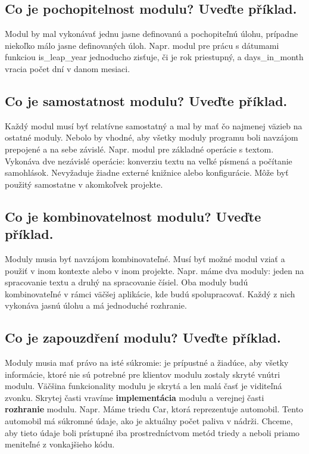 \subsection{Co je pochopitelnost modulu? Uveďte příklad.}
Modul by mal vykonávať jednu jasne definovanú a pochopiteľnú úlohu, prípadne niekoľko málo jasne definovaných úloh. \newline
Napr. modul pre prácu s dátumami funkciou is\_leap\_year jednoducho zisťuje, či je rok priestupný, a days\_in\_month vracia počet dní v danom mesiaci.


\subsection{Co je samostatnost modulu? Uveďte příklad.}
Každý modul musí byť relatívne samostatný a mal by mať čo najmenej väzieb na ostatné moduly. Nebolo by vhodné, aby všetky moduly programu boli navzájom prepojené a na sebe závislé. \newline
Napr. modul pre základné operácie s textom. Vykonáva dve nezávislé operácie: konverziu textu na veľké písmená a počítanie samohlások. Nevyžaduje žiadne externé knižnice alebo konfigurácie. Môže byť použitý samostatne v akomkoľvek projekte.


\subsection{Co je kombinovatelnost modulu? Uveďte příklad.}
Moduly musia byť navzájom kombinovateľné. Musí byť možné modul vziať a použiť v inom kontexte alebo v inom projekte. \newline
Napr. máme dva moduly: jeden na spracovanie textu a druhý na spracovanie čísiel. Oba moduly budú kombinovateľné v rámci väčšej aplikácie, kde budú spolupracovať. Každý z nich vykonáva jasnú úlohu a má jednoduché rozhranie.


\subsection{Co je zapouzdření modulu? Uveďte příklad.}
Moduly musia mať právo na isté súkromie: je prípustné a žiadúce, aby všetky informácie, ktoré nie sú potrebné pre klientov modulu zostaly skryté vnútri modulu.
Väčšina funkcionality modulu je skrytá a len malá časť je viditeľná zvonku.
Skrytej časti vravíme \textbf{implementácia} modulu a verejnej časti \textbf{rozhranie} modulu. \newline
Napr. Máme triedu Car, ktorá reprezentuje automobil. Tento automobil má súkromné údaje, ako je aktuálny počet paliva v nádrži. Chceme, aby tieto údaje boli prístupné iba prostredníctvom metód triedy a neboli priamo meniteľné z vonkajšieho kódu.


